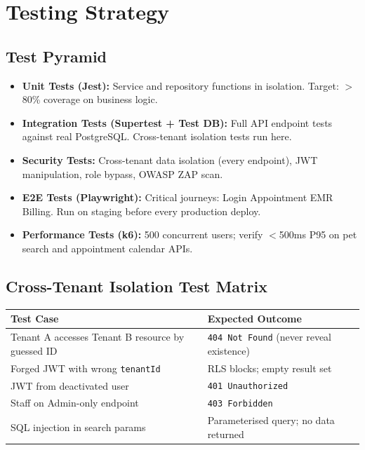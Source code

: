 \documentclass[12pt,a4paper]{report}
\begin{document}
\chapter{Testing Strategy}

\section{Test Pyramid}

\begin{itemize}
  \item \textbf{Unit Tests (Jest):} Service and repository functions in isolation. Target: $>$80\% coverage on business logic.
  \item \textbf{Integration Tests (Supertest + Test DB):} Full API endpoint tests against real PostgreSQL. Cross-tenant isolation tests run here.
  \item \textbf{Security Tests:} Cross-tenant data isolation (every endpoint), JWT manipulation, role bypass, OWASP ZAP scan.
  \item \textbf{E2E Tests (Playwright):} Critical journeys: Login \textrightarrow{} Appointment \textrightarrow{} EMR \textrightarrow{} Billing. Run on staging before every production deploy.
  \item \textbf{Performance Tests (k6):} 500 concurrent users; verify $<$500ms P95 on pet search and appointment calendar APIs.
\end{itemize}

\section{Cross-Tenant Isolation Test Matrix}

\begin{longtable}{L{5cm} L{9cm}}
\toprule
\textbf{Test Case} & \textbf{Expected Outcome} \\\midrule\endhead\bottomrule\endfoot
Tenant A accesses Tenant B resource by guessed ID & \texttt{404 Not Found} (never reveal existence) \\
Forged JWT with wrong \texttt{tenantId}            & RLS blocks; empty result set \\
JWT from deactivated user                          & \texttt{401 Unauthorized} \\
Staff on Admin-only endpoint                       & \texttt{403 Forbidden} \\
SQL injection in search params                     & Parameterised query; no data returned \\
\end{longtable}
\end{document}
